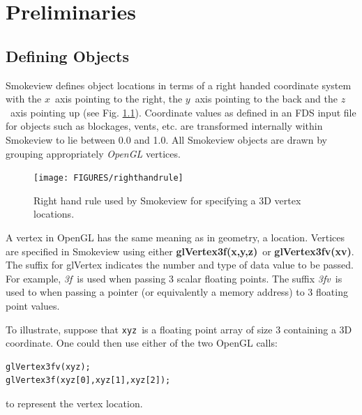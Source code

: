 \documentclass[11pt,twoside]{book}
\begin{document}
%
%

\chapter{Preliminaries}
\label{visoverview}
\section{Defining Objects} Smokeview defines object locations in terms of a right
handed coordinate system with the $x$~axis pointing to the right, the $y$~axis
pointing to the back and the $z$~axis pointing up (see Fig. \ref{figrighthand}).
Coordinate values as defined in an FDS input file for objects such as blockages,
vents, etc. are transformed internally within Smokeview to lie between 0.0 and 1.0.
All Smokeview objects are drawn by grouping appropriately {\em OpenGL} vertices.
\begin{figure}[\figoptions]
\begin{center}
\texttt{[image: FIGURES/righthandrule]}
\end{center}
\caption{Right hand rule used by Smokeview for specifying a 3D vertex locations.}
\label{figrighthand}
\end{figure}

A vertex in OpenGL has the same meaning as in geometry, a
location. Vertices are specified in Smokeview using either {\bf
glVertex3f(x,y,z)}\ or {\bf glVertex3fv(xv)}.  The suffix for
glVertex indicates the number and type of data value to be passed.
For example, {\em 3f}\ is used when passing 3 scalar floating
points.  The suffix {\em 3fv}\ is used to when passing a pointer
(or equivalently a memory address) to 3 floating point  values.

To illustrate, suppose that {\tt xyz}\ is a floating point array
of size 3 containing a 3D coordinate.  One could then use either
of the two OpenGL calls:
\begin{lstlisting}
glVertex3fv(xyz);
glVertex3f(xyz[0],xyz[1],xyz[2]);
\end{lstlisting}
to represent the vertex location.
\end{document}
